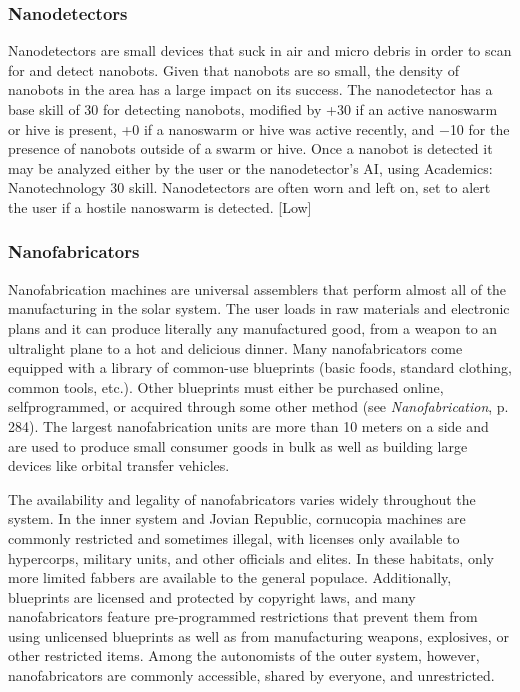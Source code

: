 \subsubsection{Nanodetectors} 

Nanodetectors are small devices that suck in air and micro debris in order to scan for and detect nanobots. Given that nanobots are so small, the density of nanobots in the area has a large impact on its success. The nanodetector has a base skill of 30 for detecting nanobots, modified by +30 if an active nanoswarm or hive is present, +0 if a nanoswarm or hive was active recently, and $-$10 for the presence of nanobots outside of a swarm or hive. Once a nanobot is detected it may be analyzed either by the user or the nanodetector’s AI, using Academics: Nanotechnology 30 skill. Nanodetectors are often worn and left on, set to alert the user if a hostile nanoswarm is detected. [Low] 

\subsubsection{Nanofabricators} 

Nanofabrication machines are universal assemblers that perform almost all of the manufacturing in the solar system. The user loads in raw materials and electronic plans and it can produce literally any manufactured good, from a weapon to an ultralight plane to a hot and delicious dinner. Many nanofabricators come equipped with a library of common-use blueprints (basic foods, standard clothing, common tools, etc.). Other blueprints must either be purchased online, selfprogrammed, or acquired through some other method (see \emph{Nanofabrication}, p. 284). The largest nanofabrication units are more than 10 meters on a side and are used to produce small consumer goods in bulk as well as building large devices like orbital transfer vehicles. 

The availability and legality of nanofabricators varies widely throughout the system. In the inner system and Jovian Republic, cornucopia machines are commonly restricted and sometimes illegal, with licenses only available to hypercorps, military units, and other officials and elites. In these habitats, only more limited fabbers are available to the general populace. Additionally, blueprints are licensed and protected by copyright laws, and many nanofabricators feature pre-programmed restrictions that prevent them from using unlicensed blueprints as well as from manufacturing weapons, explosives, or other restricted items. Among the autonomists of the outer system, however, nanofabricators are commonly accessible, shared by everyone, and unrestricted. 

